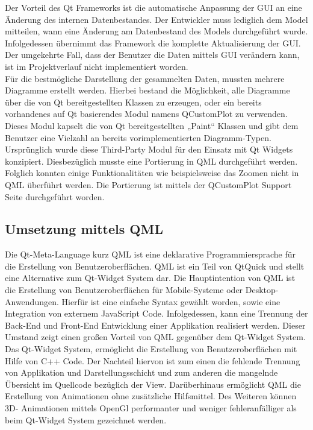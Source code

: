 Der Vorteil des Qt Frameworks ist die automatische Anpassung der GUI an eine Änderung des internen Datenbestandes. Der Entwickler muss lediglich dem Model mitteilen, wann eine Änderung am Datenbestand des Models durchgeführt wurde. Infolgedessen übernimmt das Framework die komplette Aktualisierung der GUI. Der umgekehrte Fall, dass der Benutzer die Daten mittels GUI verändern kann, ist im Projektverlauf nicht implementiert worden. \\

Für die bestmögliche Darstellung der gesammelten Daten, mussten mehrere Diagramme erstellt werden. Hierbei bestand die Möglichkeit, alle Diagramme über die von Qt bereitgestellten Klassen zu erzeugen, oder ein bereits vorhandenes auf Qt basierendes Modul namens QCustomPlot zu verwenden. Dieses Modul kapselt die von Qt bereitgestellten „Paint“ Klassen und gibt dem Benutzer eine Vielzahl an bereits vorimplementierten Diagramm-Typen. Ursprünglich wurde diese Third-Party Modul für den Einsatz mit Qt Widgets konzipiert. Diesbezüglich musste eine Portierung in QML durchgeführt werden. Folglich konnten einige Funktionalitäten wie beispielsweise das Zoomen nicht in QML überführt werden. Die Portierung ist mittels der QCustomPlot Support Seite durchgeführt worden. \\

\cite{mv} \cite{mvp} \cite{qmlqt} \cite{qmlc} \cite{qplot1} \cite{qplot2} \cite{qtbook}

\subsection{Umsetzung mittels QML}

Die Qt-Meta-Language kurz QML ist eine deklarative Programmiersprache für die Erstellung von Benutzeroberflächen. QML ist ein Teil von QtQuick und stellt eine Alternative zum Qt-Widget System dar. Die Hauptintention von QML ist die Erstellung von Benutzeroberflächen für Mobile-Systeme oder Desktop-Anwendungen. Hierfür ist eine einfache Syntax gewählt worden, sowie eine Integration von externem JavaScript Code. Infolgedessen, kann eine Trennung der Back-End und Front-End Entwicklung einer Applikation realisiert werden. Dieser Umstand zeigt einen großen Vorteil von QML gegenüber dem Qt-Widget System. Das Qt-Widget System, ermöglicht die Erstellung von Benutzeroberflächen mit Hilfe von C++ Code. Der Nachteil hiervon ist zum einen die fehlende Trennung von Applikation und Darstellungsschicht und zum anderen die mangelnde Übersicht im Quellcode bezüglich der View. Darüberhinaus ermöglicht QML die Erstellung von Animationen ohne zusätzliche Hilfsmittel. Des Weiteren können 3D- Animationen mittels OpenGl performanter und weniger fehleranfälliger als beim Qt-Widget System gezeichnet werden. \\

